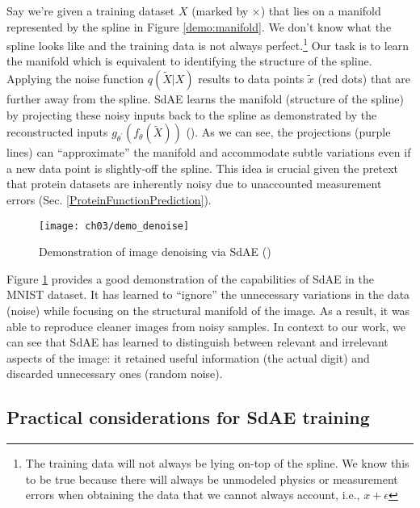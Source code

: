\par Say we're given a training dataset $X$ (marked by $\times$) that lies on
a manifold represented by the spline in Figure \ref{demo:manifold}. We don't
know what the spline looks like and the training data is not always
perfect.\footnote{The training data will not always be lying on-top of the
spline. We know this to be true because there will always be unmodeled
physics or measurement errors when obtaining the data that we cannot always
account, i.e., $x+\epsilon$} Our task is to learn the manifold which is
equivalent to identifying the structure of the spline. Applying the noise
function $q(\widetilde{X}|X)$ results to data points $\widetilde{x}$ (red
dots) that are further away from the spline. SdAE learns the manifold
(structure of the spline) by projecting these noisy inputs back to the spline
as demonstrated by the reconstructed inputs
$g_{\theta^{\prime}}(f_{\theta}(\widetilde{X}))$
(\cite{vincent2008denoising}). As we can see, the projections (purple lines)
can ``approximate'' the manifold and accommodate subtle variations even if a
new data point is slightly-off the spline. This idea is crucial given the
pretext that protein datasets are inherently noisy due to unaccounted
measurement errors (Sec. \ref{ProteinFunctionPrediction}).

\begin{figure}[h]
  \centering
  \texttt{[image: ch03/demo\_denoise]}
  \caption[Demonstration of image denoising via SdAE]{
    Demonstration of image denoising via SdAE (\cite{chollet2016autoencoders})}
  \label{demo:denoise}
\end{figure}

\par Figure \ref{demo:denoise} provides a good demonstration of the
capabilities of SdAE in the MNIST dataset. It has learned to ``ignore'' the
unnecessary variations in the data (noise) while focusing on the structural
manifold of the image. As a result, it was able to reproduce cleaner images
from noisy samples. In context to our work, we can see that SdAE has learned
to distinguish between relevant and irrelevant aspects of the image: it
retained useful information (the actual digit) and discarded unnecessary ones
(random noise). 

\subsection{Practical considerations for SdAE training}

